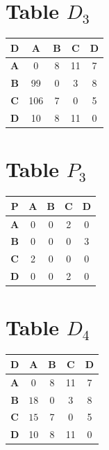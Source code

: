 \documentclass{article}
\begin{document}
\section{Table $D_{3}$}
\begin{center}
    \begin{tabular}{|c||c|c|c|c|}
        \hline
        \textbf{D} & \textbf{A} & \textbf{B} & \textbf{C} & \textbf{D} \\
        \hline
        \hline
        \textbf{A}& 0 & 8 & 11 & 7 \\
        \hline
        \textbf{B}& 99 & 0 & 3 & \cellcolor[HTML]{D74894}$8$ \\
        \hline
        \textbf{C}& 106 & 7 & 0 & 5 \\
        \hline
        \textbf{D}& 10 & 8 & 11 & 0 \\
        \hline
    \end{tabular}
\end{center}


\section{Table $P_{3}$}
\begin{center}
    \begin{tabular}{|c||c|c|c|c|}
        \hline
        \textbf{P} & \textbf{A} & \textbf{B} & \textbf{C} & \textbf{D} \\
        \hline
        \hline
        \textbf{A}& 0 & 0 & 2 & 0 \\
        \hline
        \textbf{B}& 0 & 0 & 0 & \cellcolor[HTML]{D74894}$3$ \\
        \hline
        \textbf{C}& 2 & 0 & 0 & 0 \\
        \hline
        \textbf{D}& 0 & 0 & 2 & 0 \\
        \hline
    \end{tabular}
\end{center}


\section{Table $D_{4}$}
\begin{center}
    \begin{tabular}{|c||c|c|c|c|}
        \hline
        \textbf{D} & \textbf{A} & \textbf{B} & \textbf{C} & \textbf{D} \\
        \hline
        \hline
        \textbf{A}& 0 & 8 & 11 & 7 \\
        \hline
        \textbf{B}& \cellcolor[HTML]{D74894}$18$ & 0 & 3 & 8 \\
        \hline
        \textbf{C}& \cellcolor[HTML]{D74894}$15$ & 7 & 0 & 5 \\
        \hline
        \textbf{D}& 10 & 8 & 11 & 0 \\
        \hline
    \end{tabular}
\end{center}
\end{document}
